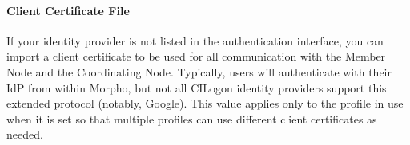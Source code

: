 \paragraph{Client Certificate File} If your identity provider is not listed in 
the authentication interface, you can import a client certificate to be used 
for all communication with the Member Node and the Coordinating Node. Typically, users 
will authenticate with their IdP from within Morpho, but not all CILogon identity providers 
support this extended protocol (notably, Google). This value applies only to the profile in 
use when it is set so that multiple profiles can use different client certificates as needed.
